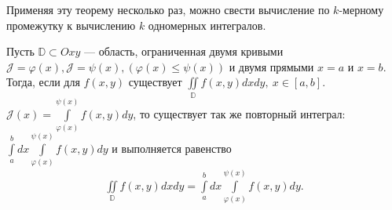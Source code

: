 \begin{remark}
  Применяя эту теорему несколько раз, можно свести вычисление по $k$-мерному
  промежутку к вычислению $k$ одномерных интегралов.
\end{remark}

\begin{consequence}
  Пусть $\mathbb{D} \subset Oxy$ --- область, ограниченная двумя кривыми
  $\mathcal{J} = \varphi(x), \mathcal{J} = \psi(x), (\varphi(x) \leq \psi(x))$
  и двумя прямыми $x = a$ и $x = b$. \\
  Тогда, если для $f(x, y)$ существует $\iint\limits_\mathbb{D} f(x, y)
  dx dy, \ x \in [a,b]$. \\
  $\mathcal{J}(x) = \int\limits_{\varphi(x)}^{\psi(x)} f(x, y) dy$, то
  существует так же повторный интеграл: $\int\limits_a^b dx
  \int\limits_{\varphi(x)}^{\psi(x)} f(x, y) dy$ и выполняется равенство
  \begin{gather*}
    \iint\limits_\mathbb{D} f(x, y) dx dy = \int\limits_a^b dx
    \int\limits_{\varphi(x)}^{\psi(x)} f(x, y) dy.
  \end{gather*}
\end{consequence}

